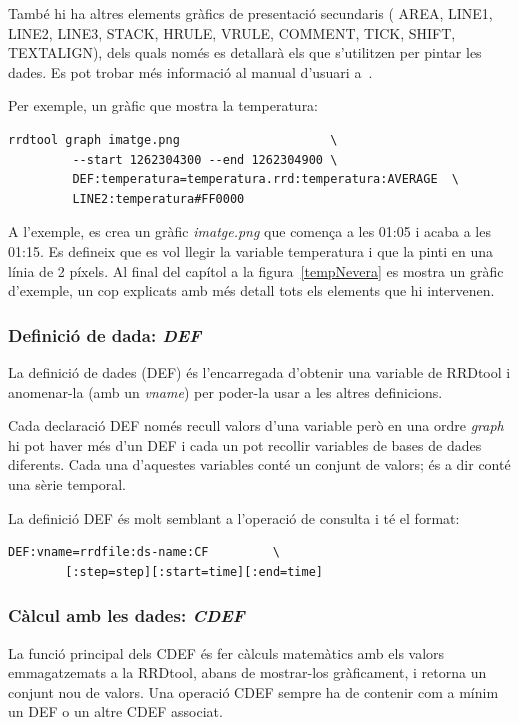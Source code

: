 També hi ha altres elements gràfics de presentació secundaris ( AREA, LINE1, LINE2, LINE3, STACK, HRULE, VRULE, COMMENT, TICK, SHIFT, TEXTALIGN), dels quals només es detallarà els que s'utilitzen per pintar les dades. Es pot trobar més informació al manual d'usuari a~\cite{rrdtool_graph}.


Per exemple, un gràfic que mostra la temperatura:
\begin{verbatim}
rrdtool graph imatge.png                     \             
         --start 1262304300 --end 1262304900 \              
         DEF:temperatura=temperatura.rrd:temperatura:AVERAGE  \            
         LINE2:temperatura#FF0000
\end{verbatim}

A l'exemple, es crea un gràfic \emph{imatge.png} que comença a les 01:05 i acaba a les 01:15. 
Es defineix que es vol llegir la variable temperatura i que la pinti en una línia de 2 píxels. Al final del capítol a la figura~\ref{tempNevera} es mostra un gràfic d'exemple, un cop explicats amb més detall tots els elements que hi intervenen.


\subsubsection{Definició de dada: \emph{DEF}}

La definició de dades (DEF) és l'encarregada d'obtenir una variable de RRDtool i anomenar-la (amb un \emph{vname}) per poder-la usar a les altres definicions. 


Cada declaració DEF només recull valors d'una variable però en una ordre \emph{graph} hi pot haver més d'un DEF i cada un pot recollir variables de bases de dades diferents. Cada una d'aquestes variables conté un conjunt de valors; és a dir conté una sèrie temporal.

La definició DEF és molt semblant a l'operació de consulta i té el format:
\begin{verbatim}
DEF:vname=rrdfile:ds-name:CF         \
        [:step=step][:start=time][:end=time]
\end{verbatim}


\subsubsection{Càlcul amb les dades: \emph{CDEF}}\label{cdef}
La funció principal dels CDEF és fer càlculs matemàtics amb els valors emmagatzemats a la RRDtool, abans de mostrar-los gràficament, i retorna un conjunt nou de valors.
Una operació CDEF sempre ha de contenir com a mínim un DEF o un altre CDEF associat. 


